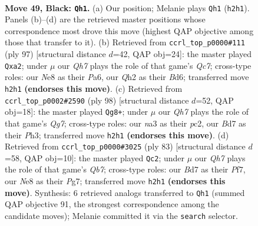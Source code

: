 \documentclass[11pt]{article}
\begin{document}
\clearpage

\begin{figure}[p]\centering
\begin{subfigure}{0.46\textwidth}\centering
\resizebox{\linewidth}{!}{%
\newchessgame
\chessboard[
  setfen={4n3/3b4/p5k1/3PPp1p/6p1/N7/5P1q/Q4KN1 b - - 2 49},
  showmover=false,
  pgfstyle=straightmove, color=movearrow, markmove={h2-h1}
]}
\caption{}
\end{subfigure}\hfill
\begin{subfigure}{0.46\textwidth}\centering
\resizebox{\linewidth}{!}{%
\newchessgame
\chessboard[
  setfen={1k6/1pp3Q1/p2b4/4N3/3P4/1P4PK/P1q5/8 b - - 2 49},
  showmover=false,
  pgfstyle=straightmove, color=movearrow, markmove={c2-a2}
]}
\caption{}
\end{subfigure}
\\[4pt]
\begin{subfigure}{0.46\textwidth}\centering
\resizebox{\linewidth}{!}{%
\newchessgame
\chessboard[
  setfen={4k3/R2n2Q1/2q1p2p/8/3p4/7P/P1p2PP1/6K1 w - - 2 50},
  showmover=false,
  pgfstyle=straightmove, color=movearrow, markmove={g7-g8}
]}
\caption{}
\end{subfigure}\hfill
\begin{subfigure}{0.46\textwidth}\centering
\resizebox{\linewidth}{!}{%
\newchessgame
\chessboard[
  setfen={6k1/5pp1/7p/1p6/2b5/P3QPBP/1q4P1/6K1 b - - 5 42},
  showmover=false,
  pgfstyle=straightmove, color=movearrow, markmove={b2-c2}
]}
\caption{}
\end{subfigure}
\caption{\textbf{Move 49, Black: \texttt{Qh1}.} (a) Our position; Melanie plays \texttt{Qh1} (\texttt{h2h1}). Panels (b)--(d) are the retrieved master positions whose correspondence most drove this move (highest QAP objective among those that transfer to it). (b) Retrieved from \texttt{ccrl\_top\_p0000\#111} (ply 97) [structural distance $d$=42, QAP obj=24]: the master played \texttt{Qxa2}; under $\mu$ our \emph{Qh7} plays the role of that game's \emph{Qc7}; cross-type roles: our \emph{N}e8 as their \emph{P}a6, our \emph{Q}h2 as their \emph{B}d6; transferred move \texttt{h2h1} \textbf{(endorses this move)}. (c) Retrieved from \texttt{ccrl\_top\_p0002\#2590} (ply 98) [structural distance $d$=52, QAP obj=18]: the master played \texttt{Qg8+}; under $\mu$ our \emph{Qh7} plays the role of that game's \emph{Qg7}; cross-type roles: our \emph{n}a3 as their \emph{p}c2, our \emph{B}d7 as their \emph{P}h3; transferred move \texttt{h2h1} \textbf{(endorses this move)}. (d) Retrieved from \texttt{ccrl\_top\_p0000\#3025} (ply 83) [structural distance $d$=58, QAP obj=10]: the master played \texttt{Qc2}; under $\mu$ our \emph{Qh7} plays the role of that game's \emph{Qb7}; cross-type roles: our \emph{B}d7 as their \emph{P}f7, our \emph{N}e8 as their \emph{P}g7; transferred move \texttt{h2h1} \textbf{(endorses this move)}. Synthesis: 6 retrieved analogs transferred to \texttt{Qh1} (summed QAP objective 91, the strongest correspondence among the candidate moves); Melanie committed it via the \texttt{search} selector.}
\label{fig:thought-m97}
\end{figure}
\end{document}
